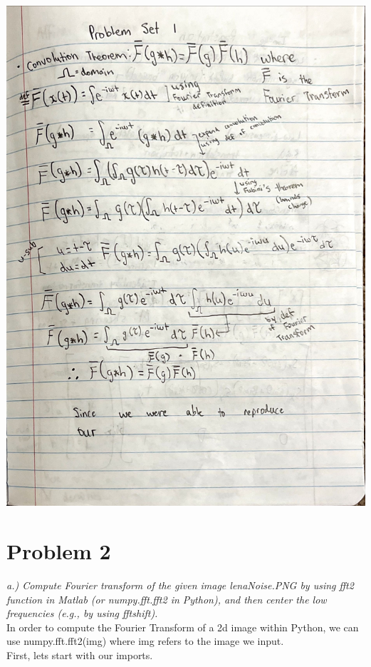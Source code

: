 \documentclass[12pt]{article}
\begin{document}
 \includegraphics[scale=0.23]{Fourier.jpeg}\\

\noindent\section*{Problem 2}

\noindent \emph {a.) Compute Fourier transform of the given image lenaNoise.PNG by using fft2 function
in Matlab (or numpy.fft.fft2 in Python), and then center the low frequencies (e.g., by
using fftshift). }\\

\noindent In order to compute the Fourier Transform of a 2d image within Python, we can use numpy.fft.fft2(img) where img refers to the image we input.\\

\noindent First, lets start with our imports.
\;
\;
\end{document}
